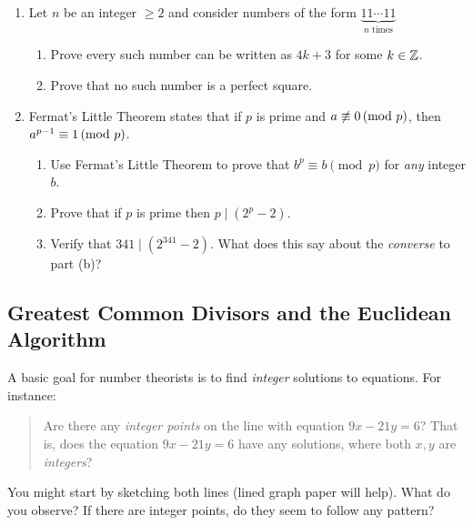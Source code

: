 \begin{exercises}{}{}
\begin{enumerate}
	    
	  \item Let $n$ be an integer $\ge 2$ and consider numbers of the form $\underbrace{11\cdots 11}_{n \text{ times}}$
	  \begin{enumerate}
	    \item Prove every such number can be written as $4k+3$ for some $k\in\mathbb{Z}$.
	    \item Prove that no such number is a perfect square.
	  \end{enumerate}
		
	    
	  \item Fermat's Little Theorem states that if $p$ is prime and $a\not\equiv 0\negthickspace\pmod{p}$, then $a^{p-1}\equiv 1\negthickspace\pmod{p}$.
		\begin{enumerate}
		  \item Use Fermat's Little Theorem to prove that $b^p\equiv b\pmod p$ for \emph{any} integer $b$.
		  \item Prove that if $p$ is prime then $p\mid(2^p-2)$.
		  \item Verify that $341\mid (2^{341}-2)$. What does this say about the \emph{converse} to part (b)?
		\end{enumerate}
	  
	  
	\end{enumerate}

\end{exercises}

\clearpage


\subsection{Greatest Common Divisors and the Euclidean Algorithm}\label{sec:gcd}

A basic goal for number theorists is to find \emph{integer} solutions to equations. For instance:
\begin{quote}
	Are there any \emph{integer points} on the line with equation $9x-21y=6$? That is, does the equation $9x-21y=6$ have any solutions, where both $x,y$ are \emph{integers}?
\end{quote}



You might start by sketching both lines (lined graph paper will help). What do you observe? If there are integer points, do they seem to follow any pattern?\smallbreak

